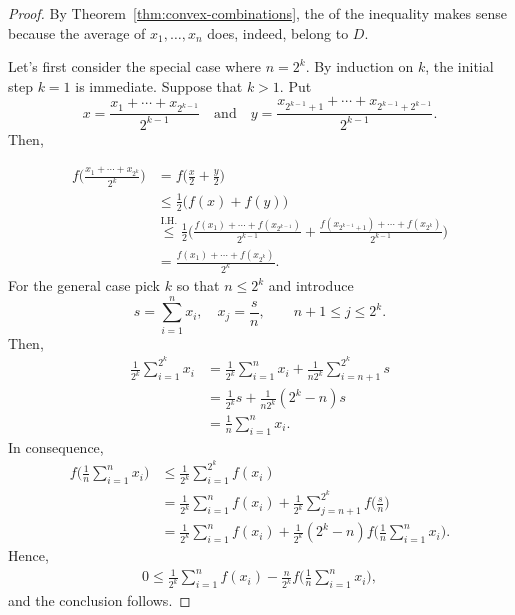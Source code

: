 \begin{proof}
    By Theorem~\ref{thm:convex-combinations}, the \lhs of the inequality makes sense because the average of $x_1,\dots,x_n$ does, indeed, belong to $D$.
    
    Let's first consider the special case where $n=2^k$. By induction on $k$, the initial step $k=1$ is immediate. Suppose that $k>1$. Put
    $$
        x = \frac{x_1+\cdots+x_{2^{k-1}}}{2^{k-1}}
        \quad\text{and}\quad
        y = \frac{x_{2^{k-1}+1}+\cdots
            +x_{2^{k-1}+2^{k-1}}}{2^{k-1}}.
    $$
    Then,
    
    \vspace{-2\parskip}
    \small
    \begin{align*}
        f\Big(\frac{x_1+\cdots+x_{2^k}}{2^k}\Big)
            &= f\Big(\frac x2+\frac y2\Big)\\
            &\le \frac12\big(f(x)+f(y)\big)\\
            &\stackrel{\text{I.H.}}\le \frac12
                \Big(
                \frac{f(x_1)+\cdots+f(x_{2^{k-1}})}{2^{k-1}}
                +\frac{f(x_{2^{k-1}+1})+\cdots
                    +f(x_{2^k})}{2^{k-1}}
                \Big)\\
            &= \frac{f(x_1)+\cdots+f(x_{2^k})}{2^k}.
    \end{align*}
    \normalsize
    For the general case pick $k$ so that $n\le 2^k$ and introduce
    \[
        s=\sum_{i=1}^nx_i,\quad x_j=\frac sn,\qquad n+1\le j\le 2^k.
    \]
    Then,
    \begin{align*}
        \frac1{2^k}\sum_{i=1}^{2^k}x_i
            &= \frac1{2^k}\sum_{i=1}^nx_i
                +\frac1{n2^k}\sum_{i=n+1}^{2^k}s\\
            &= \frac1{2^k}s
                +\frac1{n2^k}(2^k-n)s\\
            &= \frac1n\sum_{i=1}^nx_i.
    \end{align*}
    In consequence,
    \begin{align*}
        f\Big(\frac1n\sum_{i=1}^nx_i\Big)
            &\le \frac1{2^k}\sum_{i=1}^{2^k}f(x_i)\\
            &= \frac1{2^k}\sum_{i=1}^nf(x_i)
                + \frac1{2^k}\sum_{j=n+1}^{2^k}f\Big(\frac sn\Big)\\
            &= \frac1{2^k}\sum_{i=1}^nf(x_i)
                + \frac1{2^k}(2^k-n)
                    f\Big(\frac1n\sum_{i=1}^nx_i\Big).
    \end{align*}
    Hence,
    \begin{align*}
        0 \le \frac1{2^k}\sum_{i=1}^nf(x_i)
                - \frac n{2^k}
                    f\Big(\frac1n\sum_{i=1}^nx_i\Big),
    \end{align*}
    and the conclusion follows.
\end{proof}

